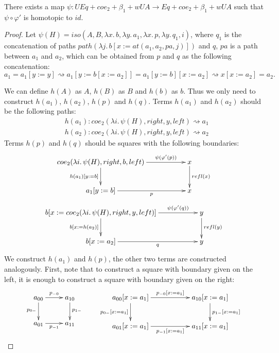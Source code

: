 \documentclass{mscs}
\newcommand{\repl}{:=}
\newcommand{\idtype}{\rightsquigarrow}
\numberwithin{figure}{section}
\begin{document}
\begin{lem}[UA]
There exists a map $\psi : UEq + coe_2 + \beta_1 + wUA \to Eq + coe_2 + \beta_1 + wUA$ such that $\psi \circ \varphi'$ is homotopic to $id$.
\end{lem}
\begin{proof}
Let $\psi(H) = iso(A, B, \lambda x.\,b, \lambda y.\,a_1, \lambda x.\,p, \lambda y.\,q_1, i)$, where
$q_1$ is the concatenation of paths $path(\lambda j.\,b[x \repl at(a_1, a_2, pa,j)])$ and $q$,
$pa$ is a path between $a_1$ and $a_2$, which can be obtained from $p$ and $q$ as the following concatenation:
\[ a_1 = a_1[y \repl y] \idtype a_1[y \repl b[x \repl a_2]] = a_1[y \repl b][x \repl a_2] \idtype x[x \repl a_2] = a_2. \]

We can define $h(A)$ as $A$, $h(B)$ as $B$ and $h(b)$ as $b$.
Thus we only need to construct $h(a_1)$, $h(a_2)$, $h(p)$ and $h(q)$.
Terms $h(a_1)$ and $h(a_2)$ should be the following paths:
\begin{align*}
& h(a_1) : coe_2(\lambda i.\,\psi(H), right, y, left) \idtype a_1 \\
& h(a_2) : coe_2(\lambda i.\,\psi(H), right, y, left) \idtype a_2
\end{align*}
Terms $h(p)$ and $h(q)$ should be squares with the following boundaries:
\[ \xymatrix{ coe_2(\lambda i.\,\psi(H), right, b, left) \ar[rr]^-{\psi(\varphi'(p))} \ar[d]_{h(a_1)[y \repl b]} & & x \ar[d]^{refl(x)} \\
              a_1[y \repl b] \ar[rr]_-p                                                                          & & x
            } \]
\[ \xymatrix{ b[x \repl coe_2(\lambda i.\,\psi(H), right, y, left)] \ar[rr]^-{\psi(\varphi'(q))} \ar[d]_{b[x \repl h(a_2)]} & & y \ar[d]^{refl(y)} \\
              b[x \repl a_2] \ar[rr]_-q                                                                                     & & y
            } \]
We construct $h(a_1)$ and $h(p)$, the other two terms are constructed analogously.
First, note that to construct a square with boundary given on the left, it is enough to construct a square with boundary given on the right:
\[ \xymatrix{ a_{00} \ar[r]^{p_{-0}} \ar[d]_{p_{0-}} & a_{10} \ar[d]^{p_{1-}} \\
              a_{01} \ar[r]_{p_{-1}}                 & a_{11}
            }
\qquad
   \xymatrix{ a_{00}[x \repl a_1] \ar[rr]^{p_{-0}[x \repl a_1]} \ar[d]_{p_{0-}[x \repl a_1]} & & a_{10}[x \repl a_1] \ar[d]^{p_{1-}[x \repl a_1]} \\
              a_{01}[x \repl a_1] \ar[rr]_{p_{-1}[x \repl a_1]}                              & & a_{11}[x \repl a_1]
}\]
\end{proof}
\end{document}
